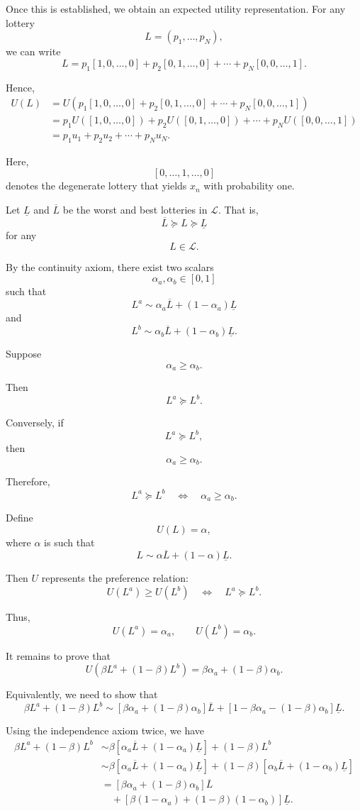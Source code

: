 Once this is established, we obtain an expected utility representation. For any lottery
\[
L=(p_1,\dots,p_N),
\]
we can write
\[
L
=
p_1[1,0,\dots,0]
+
p_2[0,1,\dots,0]
+
\cdots
+
p_N[0,0,\dots,1].
\]

Hence,
\[
\begin{aligned}
U(L)
&=
U\left(
p_1[1,0,\dots,0]
+
p_2[0,1,\dots,0]
+
\cdots
+
p_N[0,0,\dots,1]
\right) \\
&=
p_1U([1,0,\dots,0])
+
p_2U([0,1,\dots,0])
+
\cdots
+
p_NU([0,0,\dots,1]) \\
&=
p_1u_1+p_2u_2+\cdots+p_Nu_N.
\end{aligned}
\]

Here,
\[
[0,\dots,1,\dots,0]
\]
denotes the degenerate lottery that yields \(x_n\) with probability one.

Let \(\underline L\) and \(\overline L\) be the worst and best lotteries in \(\mathcal{L}\). That is,
\[
\overline L\succeq L\succeq \underline L
\]
for any
\[
L\in\mathcal{L}.
\]

By the continuity axiom, there exist two scalars
\[
\alpha_a,\alpha_b\in[0,1]
\]
such that
\[
L^a
\sim
\alpha_a\overline L+(1-\alpha_a)\underline L
\]
and
\[
L^b
\sim
\alpha_b\overline L+(1-\alpha_b)\underline L.
\]

Suppose
\[
\alpha_a\ge \alpha_b.
\]

Then
\[
L^a\succeq L^b.
\]

Conversely, if
\[
L^a\succeq L^b,
\]
then
\[
\alpha_a\ge \alpha_b.
\]

Therefore,
\[
L^a\succeq L^b
\quad\Longleftrightarrow\quad
\alpha_a\ge \alpha_b.
\]

Define
\[
U(L)=\alpha,
\]
where \(\alpha\) is such that
\[
L\sim \alpha\overline L+(1-\alpha)\underline L.
\]

Then \(U\) represents the preference relation:
\[
U(L^a)\ge U(L^b)
\quad\Longleftrightarrow\quad
L^a\succeq L^b.
\]

Thus,
\[
U(L^a)=\alpha_a,
\qquad
U(L^b)=\alpha_b.
\]

It remains to prove that
\[
U(\beta L^a+(1-\beta)L^b)
=
\beta\alpha_a+(1-\beta)\alpha_b.
\]

Equivalently, we need to show that
\[
\beta L^a+(1-\beta)L^b
\sim
\left[
\beta\alpha_a+(1-\beta)\alpha_b
\right]\overline L
+
\left[
1-\beta\alpha_a-(1-\beta)\alpha_b
\right]\underline L.
\]

Using the independence axiom twice, we have
\[
\begin{aligned}
\beta L^a+(1-\beta)L^b
&\sim
\beta\left[
\alpha_a\overline L+(1-\alpha_a)\underline L
\right]
+
(1-\beta)L^b \\
&\sim
\beta\left[
\alpha_a\overline L+(1-\alpha_a)\underline L
\right]
+
(1-\beta)\left[
\alpha_b\overline L+(1-\alpha_b)\underline L
\right] \\
&=
\left[
\beta\alpha_a+(1-\beta)\alpha_b
\right]\overline L \\
&\quad+
\left[
\beta(1-\alpha_a)+(1-\beta)(1-\alpha_b)
\right]\underline L.
\end{aligned}
\]

